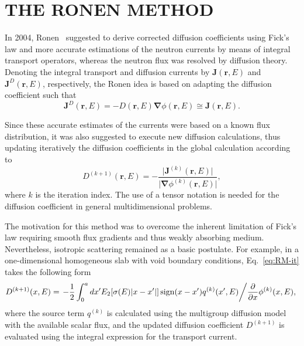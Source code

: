 \documentclass[letterpaper]{physor2020}
\newcommand{\rr}{\ensuremath{\bm{r}}}
\newcommand{\bnabla}{\ensuremath{\bm{\nabla}}}
\newcommand{\rE}{\ensuremath{(\rr,E)}}
\begin{document}
\section{THE RONEN METHOD}
\label{sec:RM}

In 2004, Ronen~\cite{Ronen-2004} suggested to derive corrected diffusion coefficients using Fick's law and more accurate estimations of the neutron currents by means of integral transport operators, whereas the neutron flux was resolved by diffusion theory. Denoting the integral transport and diffusion currents by $\bm{J}\rE$ and $\bm{J}^D\rE$, respectively, the Ronen idea is based on adapting the diffusion coefficient such that
\begin{equation}
  \label{eq:Fick}
  \bm{J}^D\rE = -D\rE\bnabla\phi\rE \cong \bm{J}\rE.
\end{equation}

Since these accurate estimates of the currents were based on a known flux distribution, it was also suggested to execute new diffusion calculations, thus updating iteratively the diffusion coefficients in the global calculation according to
\begin{equation}
  \label{eq:RM-it}
  D^{(k+1)}\rE = - \frac{\lvert \bm{J}^{(k)}\rE \rvert}{\lvert \bnabla \phi^{(k)}\rE \rvert},
\end{equation}
where $k$ is the iteration index. The use of a tensor notation is needed for the diffusion coefficient in general multidimensional problems.

The motivation for this method was to overcome the inherent limitation of Fick's law requiring smooth flux gradients and thus weakly absorbing medium. Nevertheless, isotropic scattering remained as a basic postulate. For example, in a one-dimensional homogeneous slab with void boundary conditions, Eq.~\eqref{eq:RM-it} takes the following form~\cite{Ronen-2004}
\begin{equation}
  \label{eq:RM-it-1D-slab}
  D^{(k+1)}(x,E) = \left. -\frac{1}{2} \int_0^a dx'
    {E_2[\sigma(E) \lvert x-x' \rvert]\operatorname{sign}(x-x')q^{(k)}(x',E)}
    \middle/ \frac{\partial}{\partial x}\phi^{(k)}(x,E),\right.
\end{equation}
where the source term $q^{(k)}$ is calculated using the multigroup diffusion model with the available scalar flux, and the updated diffusion coefficient $D^{(k+1)}$ is evaluated using the integral expression for the transport current.
\end{document}

